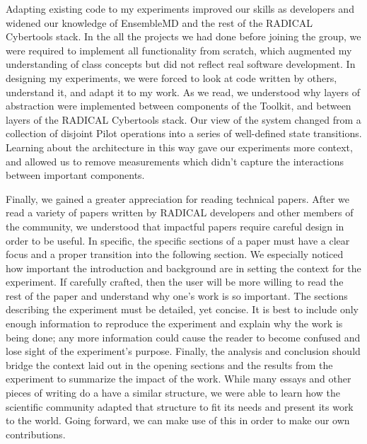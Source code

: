 \documentclass[]{article}
\begin{document}
	Adapting existing code to my experiments improved our skills as developers and widened our knowledge of EnsembleMD and the rest of the RADICAL Cybertools stack. In the all the projects we had done before joining the group, we were required to implement all functionality from scratch, which augmented my understanding of class concepts but did not reflect real software development. In designing my experiments, we were forced to look at code written by others, understand it, and adapt it to my work. As we read, we understood why layers of abstraction were implemented between components of the Toolkit, and between layers of the RADICAL Cybertools stack. Our view of the system changed from a collection of disjoint Pilot operations into a series of well-defined state transitions. Learning about the architecture in this way gave our experiments more context, and allowed us to remove measurements which didn't capture the interactions between important components. 


	Finally, we gained a greater appreciation for reading technical papers. After we read a variety of papers written by RADICAL developers and other members of the community, we understood that impactful papers require careful design in order to be useful. In specific, the specific sections of a paper must have a clear focus and a proper transition into the following section. We especially noticed how important the introduction and background are in setting the context for the experiment. If carefully crafted, then the user will be more willing to read the rest of the paper and understand why one's work is so important. The sections describing the experiment must be detailed, yet concise. It is best to include only enough information to reproduce the experiment and explain why the work is being done; any more information could cause the reader to become confused and lose sight of the experiment's purpose. Finally, the analysis and conclusion should bridge the context laid out in the opening sections and the results from the experiment to summarize the impact of the work. While many essays and other pieces of writing do a have a similar structure, we were able to learn how the scientific community adapted that structure to fit its needs and present its work to the world. Going forward, we can make use of this in order to make our own contributions.


\nocite{pstar}
\nocite{saga_paper}

{}
		
\end{document}
